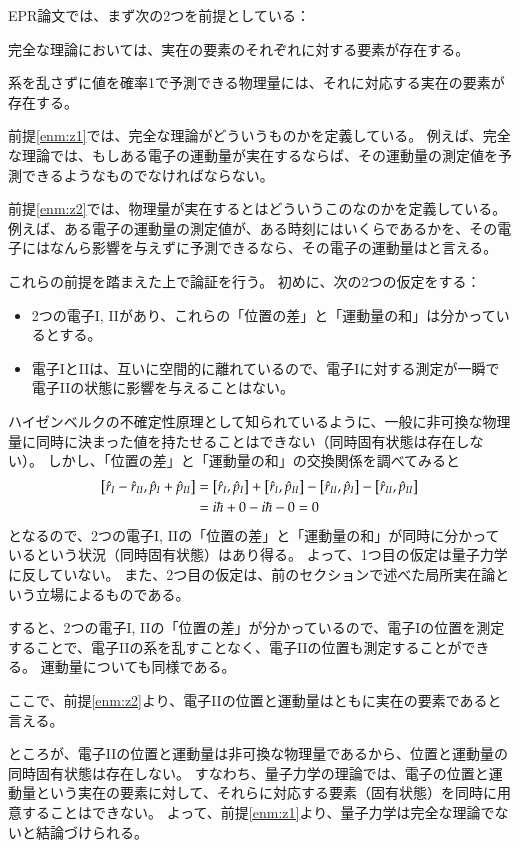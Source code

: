 \documentclass[10pt,b5paper,papersize,dvipdfmx]{jsbook}
\begin{document}
EPR論文では、まず次の2つを前提としている：
\begin{enumerate}[{label=[\arabic*]}]
  \item 完全な理論においては、実在の要素のそれぞれに対する要素が存在する。\label{enm:z1}
  \item 系を乱さずに値を確率1で予測できる物理量には、それに対応する実在の要素が存在する。\label{enm:z2}
\end{enumerate}
前提\ref{enm:z1}では、完全な理論がどういうものかを定義している。
例えば、完全な理論では、もしある電子の運動量が実在するならば、その運動量の測定値を予測できるようなものでなければならない。\par
前提\ref{enm:z2}では、物理量が実在するとはどういうこのなのかを定義している。
例えば、ある電子の運動量の測定値が、ある時刻にはいくらであるかを、その電子にはなんら影響を与えずに予測できるなら、その電子の運動量はと言える。
\par
これらの前提を踏まえた上で論証を行う。
初めに、次の2つの仮定をする：

\begin{itemize}
  \item 2つの電子I, IIがあり、これらの「位置の差」と「運動量の和」は分かっているとする。
  \item 電子IとIIは、互いに空間的に離れているので、電子Iに対する測定が一瞬で電子IIの状態に影響を与えることはない。
\end{itemize}

ハイゼンベルクの不確定性原理として知られているように、一般に非可換な物理量に同時に決まった値を持たせることはできない（同時固有状態は存在しない）。
しかし、「位置の差」と「運動量の和」の交換関係を調べてみると
\begin{align*}
  \comm{\hat r_I - \hat r_{II}}{\hat p_I + \hat p_{II}}
  &= \comm{\hat r_I}{\hat p_I} + \comm{\hat r_I}{\hat p_{II}} - \comm{\hat r_{II}}{\hat p_I} - \comm{\hat r_{II}}{\hat p_{II}} \\
  &= i\hbar + 0 - i\hbar - 0
  = 0
\end{align*}
となるので、2つの電子I, IIの「位置の差」と「運動量の和」が同時に分かっているという状況（同時固有状態）はあり得る。
よって、1つ目の仮定は量子力学に反していない。
また、2つ目の仮定は、前のセクションで述べた局所実在論という立場によるものである。
\par
すると、2つの電子I, IIの「位置の差」が分かっているので、電子Iの位置を測定することで、電子IIの系を乱すことなく、電子IIの位置も測定することができる。
運動量についても同様である。
\par
ここで、前提\ref{enm:z2}より、電子IIの位置と運動量はともに実在の要素であると言える。
\par
ところが、電子IIの位置と運動量は非可換な物理量であるから、位置と運動量の同時固有状態は存在しない。
すなわち、量子力学の理論では、電子の位置と運動量という実在の要素に対して、それらに対応する要素（固有状態）を同時に用意することはできない。
よって、前提\ref{enm:z1}より、量子力学は完全な理論でないと結論づけられる。
\end{document}
